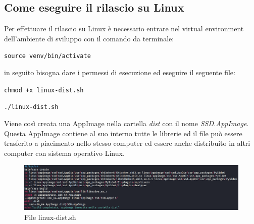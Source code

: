 \subsection{Come eseguire il rilascio su Linux}
Per effettuare il rilascio su Linux è necessario entrare nel virtual environment dell'ambiente di sviluppo con il comando da terminale:
\newline{}\centerline{\texttt{source venv/bin/activate}}\newline{}
in seguito bisogna dare i permessi di esecuzione ed eseguire il seguente file:
\newline{}\centerline{\texttt{chmod +x linux-dist.sh}}
\newline{}\centerline{\texttt{./linux-dist.sh}}\newline{}
Viene così creata una AppImage nella cartella \textit{dist} con il nome \textit{SSD.AppImage}. \\
Questa AppImage contiene al suo interno tutte le librerie ed il file può essere trasferito a piacimento nello stesso computer ed essere anche distribuito in altri computer con sistema operativo Linux.
\begin{figure}[H]
    \centering
    \includegraphics[scale = 0.2]{components/img/linux-deploy-script.png}
    \caption{File linux-dist.sh}
    \label{fig:File linux-dist.bat}
\end{figure}

